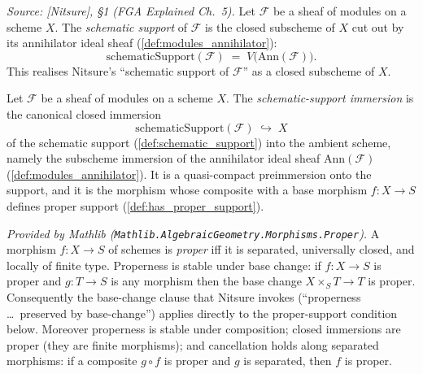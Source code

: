 \begin{definition}\leanok
  \label{def:schematic_support}
  \textit{Source: [Nitsure], \S 1 (FGA Explained Ch.~5).}
  Let \(\mathcal{F}\) be a sheaf of modules on a scheme \(X\). The
  \emph{schematic support} of \(\mathcal{F}\) is the closed subscheme of \(X\)
  cut out by its annihilator ideal sheaf (\cref{def:modules_annihilator}):
  \[
    \mathrm{schematicSupport}(\mathcal{F})
    \;=\; V\bigl(\mathrm{Ann}(\mathcal{F})\bigr).
  \]
  This realises Nitsure's ``schematic support of \(\mathcal{F}\)'' as a closed
  subscheme of \(X\).
\end{definition}

\begin{definition}\leanok
  \label{def:schematic_support_immersion}
  Let \(\mathcal{F}\) be a sheaf of modules on a scheme \(X\). The
  \emph{schematic-support immersion} is the canonical closed immersion
  \[
    \mathrm{schematicSupport}(\mathcal{F}) \;\hookrightarrow\; X
  \]
  of the schematic support (\cref{def:schematic_support}) into the ambient
  scheme, namely the subscheme immersion of the annihilator ideal sheaf
  \(\mathrm{Ann}(\mathcal{F})\) (\cref{def:modules_annihilator}). It is a
  quasi-compact preimmersion onto the support, and it is the morphism whose
  composite with a base morphism \(f : X \to S\) defines proper support
  (\cref{def:has_proper_support}).
\end{definition}

\begin{lemma}
  \label{lem:isProper_mathlib}
  \mathlibok
  \textit{Provided by Mathlib
  (\texttt{Mathlib.AlgebraicGeometry.Morphisms.Proper}).}
  A morphism \(f : X \to S\) of schemes is \emph{proper} iff it is separated,
  universally closed, and locally of finite type. Properness is stable under base
  change: if \(f : X \to S\) is proper and \(g : T \to S\) is any morphism then
  the base change \(X \times_S T \to T\) is proper. Consequently the base-change
  clause that Nitsure invokes (``properness \ldots\ preserved by base-change'')
  applies directly to the proper-support condition below.  Moreover properness
  is stable under composition; closed immersions are proper (they are finite
  morphisms); and cancellation holds along separated morphisms: if a composite
  \(g \circ f\) is proper and \(g\) is separated, then \(f\) is proper.
\end{lemma}

